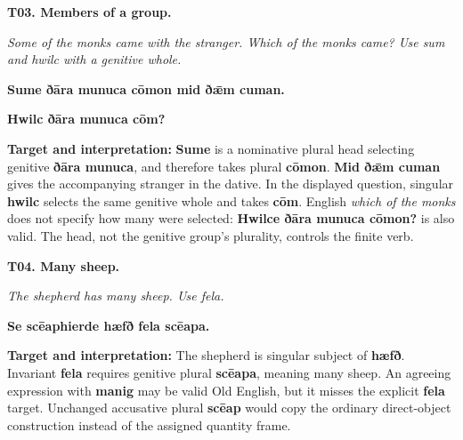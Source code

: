 \par\begin{minipage}{\linewidth}\raggedright
\textbf{T03. Members of a group.}

\emph{Some of the monks came with the stranger. Which of the monks came? Use sum and hwilc with a genitive whole.}

\textbf{Sume ðāra munuca cōmon mid ðǣm cuman.}

\textbf{Hwilc ðāra munuca cōm?}

\textbf{Target and interpretation:} \textbf{Sume} is a nominative plural head selecting genitive \textbf{ðāra munuca}, and therefore takes plural \textbf{cōmon}. \textbf{Mid ðǣm cuman} gives the accompanying stranger in the dative. In the displayed question, singular \textbf{hwilc} selects the same genitive whole and takes \textbf{cōm}. English \emph{which of the monks} does not specify how many were selected: \textbf{Hwilce ðāra munuca cōmon?} is also valid. The head, not the genitive group's plurality, controls the finite verb.

\end{minipage}\par\addvspace{4pt}

\par\begin{minipage}{\linewidth}\raggedright
\textbf{T04. Many sheep.}

\emph{The shepherd has many sheep. Use fela.}

\textbf{Se scēaphierde hæfð fela scēapa.}

\textbf{Target and interpretation:} The shepherd is singular subject of \textbf{hæfð}. Invariant \textbf{fela} requires genitive plural \textbf{scēapa}, meaning many sheep. An agreeing expression with \textbf{manig} may be valid Old English, but it misses the explicit \textbf{fela} target. Unchanged accusative plural \textbf{scēap} would copy the ordinary direct-object construction instead of the assigned quantity frame.

\end{minipage}\par\addvspace{4pt}

